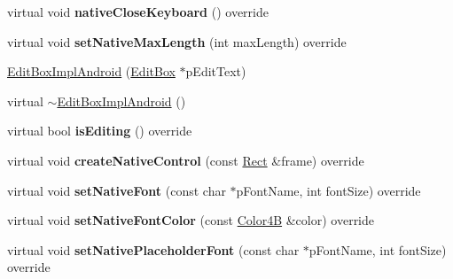 \begin{DoxyCompactItemize}
\item 
\mbox{\label{classui_1_1EditBoxImplAndroid_ad2f203261fe235e9735e2d1d0b4d9be8}} 
virtual void {\bfseries native\+Close\+Keyboard} () override
\item 
\mbox{\label{classui_1_1EditBoxImplAndroid_ab213552d826b5c254d2e70aef9eb2d30}} 
virtual void {\bfseries set\+Native\+Max\+Length} (int max\+Length) override
\item 
\hyperlink{classui_1_1EditBoxImplAndroid_a793520aec53395d984275bf55896e1a0}{Edit\+Box\+Impl\+Android} (\hyperlink{classui_1_1EditBox}{Edit\+Box} $\ast$p\+Edit\+Text)
\item 
virtual \hyperlink{classui_1_1EditBoxImplAndroid_aa900bf2b9deeefae614680e8654710b6}{$\sim$\+Edit\+Box\+Impl\+Android} ()
\item 
\mbox{\label{classui_1_1EditBoxImplAndroid_af3c8a9d59dc8c5eefb3244945a5b7457}} 
virtual bool {\bfseries is\+Editing} () override
\item 
\mbox{\label{classui_1_1EditBoxImplAndroid_ac5f5b54f78fc04b1b89a8ee71987a425}} 
virtual void {\bfseries create\+Native\+Control} (const \hyperlink{classRect}{Rect} \&frame) override
\item 
\mbox{\label{classui_1_1EditBoxImplAndroid_a6184a7d78773c06ba01c248c035adb36}} 
virtual void {\bfseries set\+Native\+Font} (const char $\ast$p\+Font\+Name, int font\+Size) override
\item 
\mbox{\label{classui_1_1EditBoxImplAndroid_a7b29f1ef0991ced11c5451183349c703}} 
virtual void {\bfseries set\+Native\+Font\+Color} (const \hyperlink{structColor4B}{Color4B} \&color) override
\item 
\mbox{\label{classui_1_1EditBoxImplAndroid_a6532dd0a7d8fd54cecc311439f39fee4}} 
virtual void {\bfseries set\+Native\+Placeholder\+Font} (const char $\ast$p\+Font\+Name, int font\+Size) override
\item 
\mbox{\label{classui_1_1EditBoxImplAndroid_a9185c433ca485f36cc671537beab8608}} 

\end{DoxyCompactItemize}
